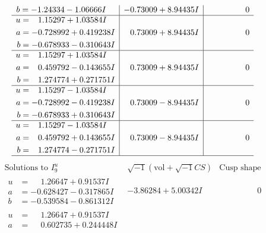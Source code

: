\documentclass[1p]{elsarticle_modified}
\theoremstyle{definition}
\newcommand{\I}{\sqrt{-1}}
\begin{document}
$$\begin{array}{c|c|c}
\begin{aligned}
b &= -1.24334 - 1.06666 I\end{aligned}
 & -0.73009 + 8.94435 I & \phantom{-0.000000 } 0 \\ \hline\begin{aligned}
u &= \phantom{-}1.15297 + 1.03584 I \\
a &= -0.728992 + 0.419238 I \\
b &= -0.678933 - 0.310643 I\end{aligned}
 & \phantom{-}0.73009 + 8.94435 I & \phantom{-0.000000 } 0 \\ \hline\begin{aligned}
u &= \phantom{-}1.15297 + 1.03584 I \\
a &= \phantom{-}0.459792 - 0.143655 I \\
b &= \phantom{-}1.274774 + 0.271751 I\end{aligned}
 & \phantom{-}0.73009 + 8.94435 I & \phantom{-0.000000 } 0 \\ \hline\begin{aligned}
u &= \phantom{-}1.15297 - 1.03584 I \\
a &= -0.728992 - 0.419238 I \\
b &= -0.678933 + 0.310643 I\end{aligned}
 & \phantom{-}0.73009 - 8.94435 I & \phantom{-0.000000 } 0 \\ \hline\begin{aligned}
u &= \phantom{-}1.15297 - 1.03584 I \\
a &= \phantom{-}0.459792 + 0.143655 I \\
b &= \phantom{-}1.274774 - 0.271751 I\end{aligned}
 & \phantom{-}0.73009 - 8.94435 I & \phantom{-0.000000 } 0\\
 \hline 
 \end{array}$$\newpage$$\begin{array}{c|c|c}  
\text{Solutions to }I^u_{9}& \I (\text{vol} + \sqrt{-1}CS) & \text{Cusp shape}\\
 \hline 
\begin{aligned}
u &= \phantom{-}1.26647 + 0.91537 I \\
a &= -0.628427 - 0.317865 I \\
b &= -0.539584 - 0.861312 I\end{aligned}
 & -3.86284 + 5.00342 I & \phantom{-0.000000 } 0 \\ \hline\begin{aligned}
u &= \phantom{-}1.26647 + 0.91537 I \\
a &= \phantom{-}0.602735 + 0.244448 I \\

\end{aligned}
\end{array}$$
\end{document}
